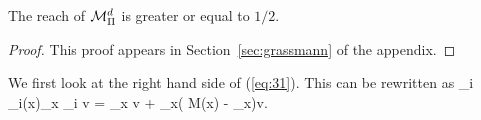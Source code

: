\documentclass[final, 12pt]{colt2018} %
\begin{document}
\begin{claim} The reach of $\mathcal M_\Pi^d$ is greater or equal to $1/2.$
\end{claim}
\begin{proof} This proof appears in Section~\ref{sec:grassmann} of the appendix.

\end{proof}
We first look at the right hand side of (\ref{eq:31}). This can be rewritten as
	\beq \sum_i \a_i(x)\Pi_x \Pi_i v = \Pi_x v + \Pi_x\left( {M(x)} - \Pi_x\right)v.\eeq
                                                                
\end{document}
